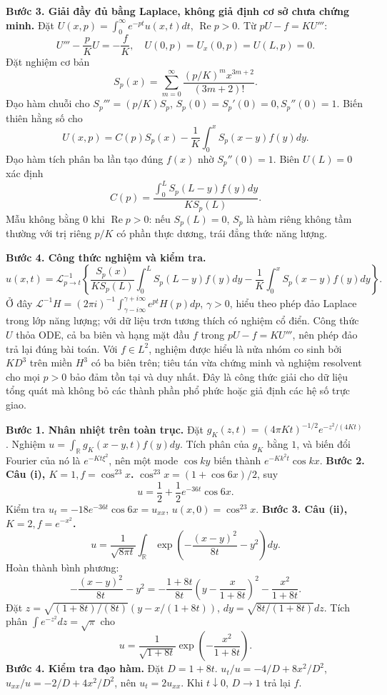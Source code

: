\textbf{Bước 3. Giải đầy đủ bằng Laplace, không giả định cơ sở chưa chứng minh.}
Đặt $U(x,p)=\int_0^\infty e^{-pt}u(x,t)dt$, $\operatorname{Re}p>0$. Từ $pU-f=KU'''$:
\[U'''-\frac pK U=-\frac fK,\quad U(0,p)=U_x(0,p)=U(L,p)=0.\]
Đặt nghiệm cơ bản
\[S_p(x)=\sum_{m=0}^\infty\frac{(p/K)^m x^{3m+2}}{(3m+2)!}.\]
Đạo hàm chuỗi cho $S_p'''=(p/K)S_p$, $S_p(0)=S_p'(0)=0,S_p''(0)=1$. Biến thiên hằng số cho
\[U(x,p)=C(p)S_p(x)-\frac1K\int_0^xS_p(x-y)f(y)dy.\]
Đạo hàm tích phân ba lần tạo đúng $f(x)$ nhờ $S_p''(0)=1$. Biên $U(L)=0$ xác định
\[C(p)=\frac{\int_0^LS_p(L-y)f(y)dy}{KS_p(L)}.\]
Mẫu không bằng $0$ khi $\operatorname{Re}p>0$: nếu $S_p(L)=0$, $S_p$ là hàm riêng không tầm thường với trị riêng $p/K$ có phần thực dương, trái đẳng thức năng lượng.

\textbf{Bước 4. Công thức nghiệm và kiểm tra.}
\[
u(x,t)=\mathcal L^{-1}_{p\to t}
\left\{\frac{S_p(x)}{KS_p(L)}\int_0^LS_p(L-y)f(y)dy
-\frac1K\int_0^xS_p(x-y)f(y)dy\right\}.
\]
Ở đây $\mathcal L^{-1}H=(2\pi i)^{-1}\int_{\gamma-i\infty}^{\gamma+i\infty}e^{pt}H(p)dp$, $\gamma>0$, hiểu theo phép đảo Laplace trong lớp năng lượng; với dữ liệu trơn tương thích có nghiệm cổ điển. Công thức $U$ thỏa ODE, cả ba biên và hạng mặt đầu $f$ trong $pU-f=KU'''$, nên phép đảo trả lại đúng bài toán. Với $f\in L^2$, nghiệm được hiểu là nửa nhóm co sinh bởi $KD^3$ trên miền $H^3$ có ba biên trên; tiêu tán vừa chứng minh và nghiệm resolvent cho mọi $p>0$ bảo đảm tồn tại và duy nhất. Đây là công thức giải cho dữ liệu tổng quát mà không bỏ các thành phần phổ phức hoặc giả định các hệ số trực giao.

\textbf{Bước 1. Nhân nhiệt trên toàn trục.}
Đặt $g_K(z,t)=(4\pi Kt)^{-1/2}e^{-z^2/(4Kt)}$. Nghiệm $u=\int_{\mathbb R}g_K(x-y,t)f(y)dy$. Tích phân của $g_K$ bằng $1$, và biến đổi Fourier của nó là $e^{-Kt\xi^2}$, nên một mode $\cos ky$ biến thành $e^{-Kk^2t}\cos kx$.
\textbf{Bước 2. Câu (i), $K=1,f=\cos^23x$.}
$\cos^23x=(1+\cos6x)/2$, suy
\[u=\frac12+\frac12e^{-36t}\cos6x.\]
Kiểm tra $u_t=-18e^{-36t}\cos6x=u_{xx}$, $u(x,0)=\cos^23x$.
\textbf{Bước 3. Câu (ii), $K=2,f=e^{-x^2}$.}
\[u=\frac1{\sqrt{8\pi t}}\int_{\mathbb R}
\exp\left(-\frac{(x-y)^2}{8t}-y^2\right)dy.\]
Hoàn thành bình phương:
\[-\frac{(x-y)^2}{8t}-y^2
=-\frac{1+8t}{8t}\left(y-\frac{x}{1+8t}\right)^2-\frac{x^2}{1+8t}.\]
Đặt $z=\sqrt{(1+8t)/(8t)}(y-x/(1+8t))$, $dy=\sqrt{8t/(1+8t)}dz$. Tích phân $\int e^{-z^2}dz=\sqrt\pi$ cho
\[u=\frac1{\sqrt{1+8t}}\exp\left(-\frac{x^2}{1+8t}\right).\]
\textbf{Bước 4. Kiểm tra đạo hàm.} Đặt $D=1+8t$. $u_t/u=-4/D+8x^2/D^2$, $u_{xx}/u=-2/D+4x^2/D^2$, nên $u_t=2u_{xx}$. Khi $t\downarrow0$, $D\to1$ trả lại $f$.

